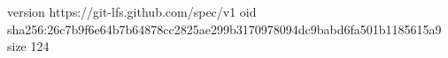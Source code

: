 version https://git-lfs.github.com/spec/v1
oid sha256:26c7b9f6e64b7b64878cc2825ae299b3170978094dc9babd6fa501b1185615a9
size 124
